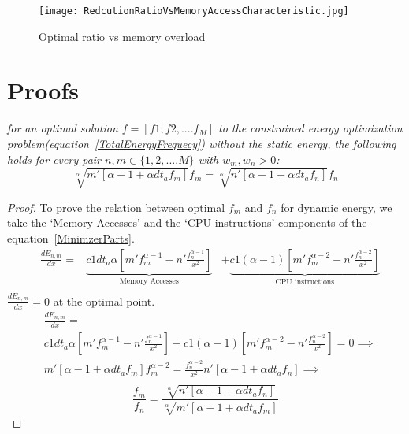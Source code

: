 \documentclass[11pt, letterpaper]{article}
\newenvironment{oldlem}[1]{\par\noindent{\bf Lemma #1:}
  \em \noindent}{\par}
\newcommand{\olem}[1]{\begin{oldlem}{\ref{#1}}}
\newcommand{\eolem}{\end{oldlem} \medskip}
\begin{document}
 \begin{figure}[h!]
  \begin{center}
   \texttt{[image: RedcutionRatioVsMemoryAccessCharacteristic.jpg]}
  \end{center}
  \vspace*{-15mm}
   \caption{Optimal ratio vs memory overload}
   \label{figure: ReductionRatio}
 \end{figure}
 
 
 
\section{Proofs}

\olem{Relation}
for an optimal solution $f=[f1,f2,....f_M]$ to the constrained energy optimization problem(equation~\ref{TotalEnergyFrequecy}) without the static energy, the following holds for every pair $n,m \in \{1,2,....M\}$ with $w_m,w_n>0$:\\
 \begin{displaymath}
  \sqrt[\alpha]{m'[\alpha -1 + \alpha dt_af_m]}f_m =  \sqrt[\alpha]{n'[\alpha -1 + \alpha dt_af_n]}f_n
 \end{displaymath}
\eolem

\begin{proof}
 To prove the relation between optimal $f_m$ and $f_n$ for dynamic energy, we take the `Memory Accesses' and the `CPU instructions' components of the equation~\ref{MinimzerParts}.
 \begin{displaymath}
   \begin{aligned}
   &\frac{dE_{n,m}}{dx} =
 &\underbrace{c1dt_a\alpha [m'f_m^{\alpha-1} - n'\frac{f_n^{\alpha-1}}{x^2}]}_\text{Memory Accesses}
 &+\underbrace{c1(\alpha-1)[m'f_m^{\alpha -2} -n'\frac{f_n^{\alpha-2}}{x^2}]}_\text{CPU instructions}\\
  \end{aligned}
 \end{displaymath} 
 $\frac{dE_{n,m}}{dx} = 0$ at the optimal point.
  \begin{displaymath}
   \begin{aligned}
   &\frac{dE_{n,m}}{dx} = \\
  & c1dt_a\alpha [m'f_m^{\alpha-1} - n'\frac{f_n^{\alpha-1}}{x^2}] +c1(\alpha-1)[m'f_m^{\alpha -2} -n'\frac{f_n^{\alpha-2}}{x^2}] = 0 \implies\\
 &m'[\alpha -1 + \alpha dt_af_m]f_m^{\alpha-2} = \frac{f_n^{\alpha-2}}{x^2}n'[\alpha -1 + \alpha dt_af_n] \implies\\
\end{aligned}
 \end{displaymath}
 \begin{equation}\label{RelationEquation}
   \frac{f_m}{f_n} = \frac{\sqrt[\alpha]{n'[\alpha -1 + \alpha dt_af_n]}}{\sqrt[\alpha]{m'[\alpha -1 + \alpha dt_af_m]}}
 \end{equation}
\end{proof}
\end{document}
